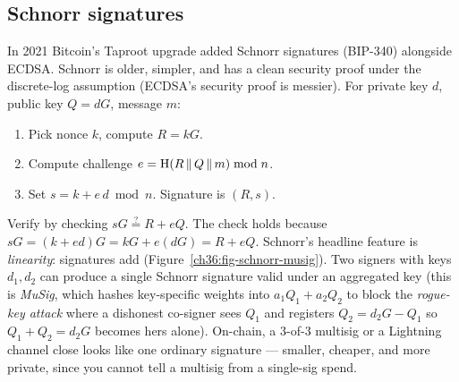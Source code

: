 \subsection{Schnorr signatures}
\label{ch36:schnorr}

In 2021 Bitcoin's Taproot upgrade added Schnorr signatures (BIP-340) alongside ECDSA. Schnorr is older, simpler, and has a clean security proof under the discrete-log assumption (ECDSA's security proof is messier). For private key $d$, public key $Q=dG$, message $m$:

\begin{enumerate}
  \item Pick nonce $k$, compute $R = kG$.
  \item Compute challenge $e = \operatorname{H}(R \,\|\, Q \,\|\, m) \bmod n$.
  \item Set $s = k + e\,d \bmod n$. Signature is $(R, s)$.
\end{enumerate}

Verify by checking $sG \stackrel{?}{=} R + eQ$. The check holds because $sG = (k+ed)G = kG + e(dG) = R + eQ$. Schnorr's headline feature is \emph{linearity}: signatures add (Figure~\ref{ch36:fig-schnorr-musig}). Two signers with keys $d_1,d_2$ can produce a single Schnorr signature valid under an aggregated key (this is \emph{MuSig}, which hashes key-specific weights into $a_1 Q_1 + a_2 Q_2$ to block the \emph{rogue-key attack} where a dishonest co-signer sees $Q_1$ and registers $Q_2 = d_2 G - Q_1$ so $Q_1 + Q_2 = d_2 G$ becomes hers alone). On-chain, a $3$-of-$3$ multisig or a Lightning channel close looks like one ordinary signature --- smaller, cheaper, and more private, since you cannot tell a multisig from a single-sig spend.

